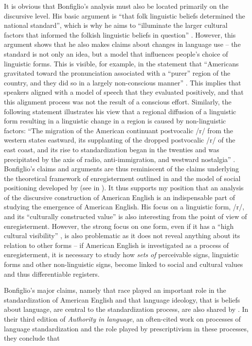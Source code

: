 It is obvious that Bonfiglio’s analysis must also be located primarily on the discursive level. His basic argument is “that folk linguistic beliefs determined the national standard”, which is why he aims to “illuminate the larger cultural factors that informed the folkish linguistic beliefs in question” \citep[73]{Bonfiglio2002}. However, this argument shows that he also makes claims about changes in language use – the standard is not only an idea, but a model that influences people’s choice of linguistic forms. This is visible, for example, in the statement that “Americans gravitated toward the pronunciation associated with a “purer” region of the country, and they did so in a largely non-conscious manner” \citep[4]{Bonfiglio2002}. This implies that speakers aligned with a model of speech that they evaluated positively, and that this alignment process was not the result of a conscious effort. Similarly, the following statement illustrates his view that a regional diffusion of a linguistic form resulting in a linguistic change in a region is caused by non-linguistic factors: “The migration of the American continuant postvocalic /r/ from the western states eastward, its supplanting of the dropped postvocalic /r/ of the east coast, and its rise to standardization began in the twenties and was precipitated by the axis of radio, anti-immigration, and westward nostalgia” \citep[60]{Bonfiglio2002}. Bonfiglio’s claims and arguments are thus reminiscent of the claims underlying the theoretical framework of enregisterment outlined in  and the model of social positioning developed by \citet{Spitzmuller2015, Spitzmuller10062016} (see  in ). It thus supports my position that an analysis of the discursive construction of American English is an indispensable part of studying the emergence of American English. His focus on a linguistic form, /r/, and its “culturally constructed value” \citep[7]{Bonfiglio2002} is also interesting from the point of view of enregisterment. However, the strong focus on one form, even if it has a “high cultural visibility” \citep[6]{Bonfiglio2002}, is also problematic as it does not reveal anything about its relation to other forms – if American English is investigated as a process of enregisterment, it is necessary to study how \emph{sets of} perceivable signs, linguistic forms and other non-linguistic signs, become linked to social and cultural values and thus differentiable registers.

Bonfiglio’s major claims, namely that race played an important role in the standardization of American English and that language ideology, that is beliefs about language, are central to the standardization process, are also shared by \citet{Milroy2012}. In their third edition of \emph{Authority in language}, an often-cited work on processes of language standardization and the role played by prescriptivism in these processes, they conclude that

